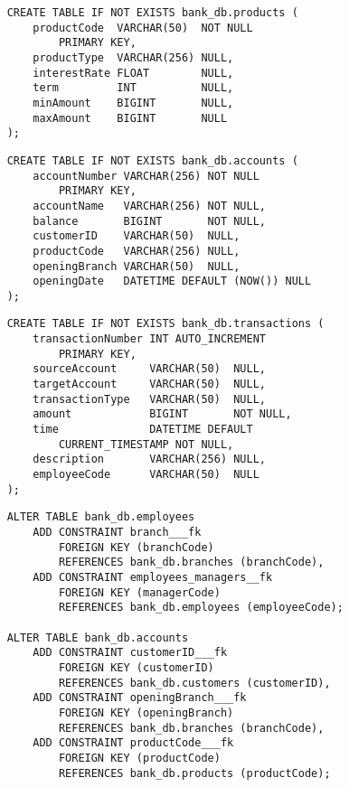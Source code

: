 \begin{enumerate}[label=\alph*.]
        
    \begin{lstlisting}
    CREATE TABLE IF NOT EXISTS bank_db.products (
        productCode  VARCHAR(50)  NOT NULL 
            PRIMARY KEY,
        productType  VARCHAR(256) NULL,
        interestRate FLOAT        NULL,
        term         INT          NULL,
        minAmount    BIGINT       NULL,
        maxAmount    BIGINT       NULL
    );
    \end{lstlisting}

        
    \begin{lstlisting}
    CREATE TABLE IF NOT EXISTS bank_db.accounts (
        accountNumber VARCHAR(256) NOT NULL 
            PRIMARY KEY,
        accountName   VARCHAR(256) NOT NULL,
        balance       BIGINT       NOT NULL,
        customerID    VARCHAR(50)  NULL,
        productCode   VARCHAR(256) NULL,
        openingBranch VARCHAR(50)  NULL,
        openingDate   DATETIME DEFAULT (NOW()) NULL
    );
    \end{lstlisting}

        
    \begin{lstlisting}
    CREATE TABLE IF NOT EXISTS bank_db.transactions (
        transactionNumber INT AUTO_INCREMENT
            PRIMARY KEY,
        sourceAccount     VARCHAR(50)  NULL,
        targetAccount     VARCHAR(50)  NULL,
        transactionType   VARCHAR(50)  NULL,
        amount            BIGINT       NOT NULL,
        time              DATETIME DEFAULT 
            CURRENT_TIMESTAMP NOT NULL,
        description       VARCHAR(256) NULL,
        employeeCode      VARCHAR(50)  NULL
    );
    \end{lstlisting}
        
    \newpage


    \begin{lstlisting}
    ALTER TABLE bank_db.employees
        ADD CONSTRAINT branch___fk
            FOREIGN KEY (branchCode) 
            REFERENCES bank_db.branches (branchCode),
        ADD CONSTRAINT employees_managers__fk
            FOREIGN KEY (managerCode) 
            REFERENCES bank_db.employees (employeeCode);

    ALTER TABLE bank_db.accounts
        ADD CONSTRAINT customerID___fk
            FOREIGN KEY (customerID) 
            REFERENCES bank_db.customers (customerID),
        ADD CONSTRAINT openingBranch___fk
            FOREIGN KEY (openingBranch) 
            REFERENCES bank_db.branches (branchCode),
        ADD CONSTRAINT productCode___fk
            FOREIGN KEY (productCode) 
            REFERENCES bank_db.products (productCode);


\end{lstlisting}
\end{enumerate}
